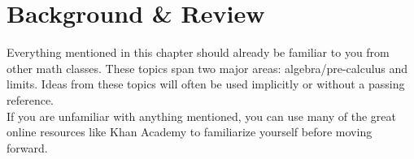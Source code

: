 \chapter{Background \& Review}
Everything mentioned in this chapter should already be familiar to you from other math classes.
These topics span two major areas: algebra/pre-calculus and limits.
Ideas from these topics will often be used implicitly or without a passing reference. \\

If you are unfamiliar with anything mentioned, you can use many of the great online resources like Khan Academy to familiarize yourself before moving forward.

